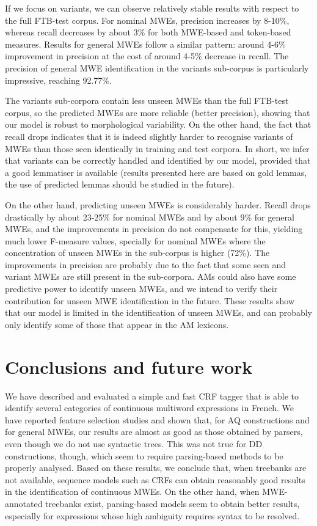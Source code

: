 \documentclass[output=paper,
modfonts
]{langscibook}
\begin{document}
If we focus on variants, we can observe relatively stable results with respect to the full FTB-test corpus. For nominal MWEs, precision increases by 8-10\%, whereas recall decreases by about 3\% for both MWE-based and token-based measures. Results for general MWEs follow a similar pattern: around 4-6\% improvement in precision at the cost of around 4-5\% decrease in recall. The precision of general MWE identification in the variants sub-corpus is particularly impressive, reaching 92.77\%.

The variants sub-corpora contain less unseen MWEs than the full FTB-test corpus, so the predicted MWEs are more reliable (better precision), showing that our model is robust to morphological variability. On the other hand, the fact that recall drops indicates that it is indeed slightly harder to recognise variants of MWEs than those seen identically in training and test corpora. In short, we infer that variants can be correctly handled and identified by our model, provided that a good lemmatiser is available (results presented here are based on gold lemmas, the use of predicted lemmas should be studied in the future).

On the other hand, predicting unseen MWEs is considerably harder. Recall drops drastically by about 23-25\% for nominal MWEs and by about 9\% for general MWEs, and the improvements in precision do not compensate for this, yielding much lower F-measure values, specially for nominal MWEs where the concentration of unseen MWEs in the sub-corpus is higher (72\%). The improvements in precision are probably due to the fact that some seen and variant MWEs are still present in the sub-corpora. AMs could also have some predictive power to identify unseen MWEs, and we intend to verify their contribution for unseen MWE identification in the future. These results show that our model is limited in the identification of unseen MWEs, and can probably only identify some of those that appear in the AM lexicons.


\section{Conclusions and future work}
\label{schol:sec:concl}

We have described and evaluated a simple and fast CRF tagger that is able to identify several categories of continuous multiword expressions in French. We have reported feature selection studies and shown that, for AQ constructions and for general MWEs, our results are almost as good as those obtained by parsers, even though we do not use syntactic trees. This was not true for DD constructions, though, which seem to require parsing-based methods to be properly analysed. Based on these results, we conclude that, when treebanks are not available, sequence models such as CRFs can obtain reasonably good results in the identification of continuous MWEs. On the other hand, when MWE-annotated treebanks exist, parsing-based models seem to obtain better results, especially for expressions whose high ambiguity requires syntax to be resolved.
\end{document}
